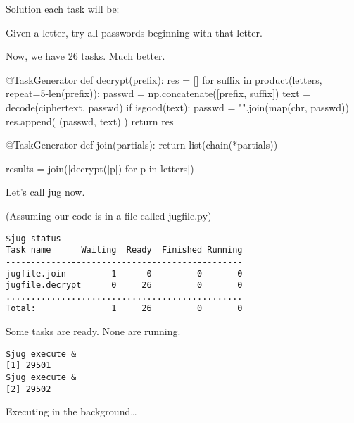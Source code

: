 \documentclass{beamer}
\begin{document}
\begin{frame}[fragile]

\alert{Solution} each task will be:

Given a letter, try \alert{all passwords} beginning with that letter.

Now, we have 26 tasks. Much better.
\end{frame}

\begin{frame}[fragile]
\begin{python}
@TaskGenerator
def decrypt(prefix):
    res = []
    for suffix in product(letters, repeat=5-len(prefix)):
        passwd = np.concatenate([prefix, suffix])
        text = decode(ciphertext, passwd)
        if isgood(text):
            passwd = "".join(map(chr, passwd))
            res.append( (passwd, text) )
    return res

@TaskGenerator
def join(partials):
    return list(chain(*partials))

results = join([decrypt([p]) for p in letters])
\end{python}
\end{frame}


\begin{frame}[fragile]

Let's call \alert{jug} now.

(Assuming our code is in a file called \alert{jugfile.py})
\end{frame}

\begin{frame}[fragile]
\begin{verbatim}
$jug status
Task name      Waiting  Ready  Finished Running
-----------------------------------------------
jugfile.join         1      0         0       0
jugfile.decrypt      0     26         0       0
...............................................
Total:               1     26         0       0

\end{verbatim}

Some tasks are ready. None are running.

\end{frame}
\begin{frame}[fragile]

\begin{verbatim}
$jug execute &
[1] 29501
$jug execute &
[2] 29502
\end{verbatim}

Executing in the background\dots

\end{frame}
\end{document}
